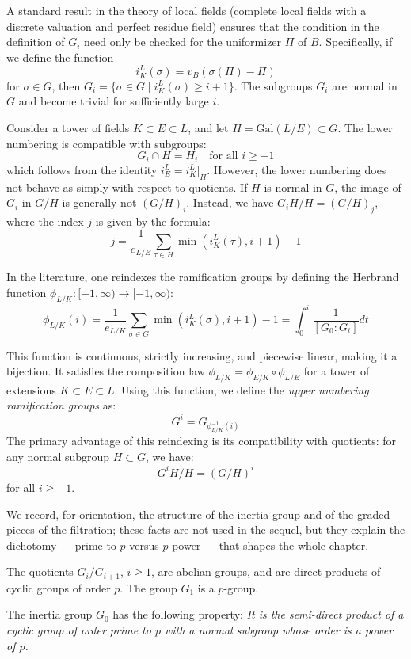 A standard result in the theory of local fields (complete local fields with a discrete valuation and perfect residue field)
ensures that the condition in the definition of $G_i$ need only be checked for the uniformizer $\Pi$ of $B$.
Specifically, if we define the function
\[
i^L_K(\sigma) = v_B(\sigma(\Pi) - \Pi)
\]
for $\sigma \in G$, then $G_i = \{ \sigma \in G \mid i^L_K(\sigma) \geq i + 1 \}$.
The subgroups $G_i$ are normal in $G$ and become trivial for sufficiently large $i$.

Consider a tower of fields $K \subset E \subset L$, and let $H = \text{Gal}(L/E) \subset G$. The lower numbering is compatible with subgroups:
\[
G_i \cap H = H_i \quad \text{for all } i \geq -1
\]
which follows from the identity $i^L_E = i^L_K|_{H}$.
However, the lower numbering does not behave as simply with respect to quotients. If $H$ is normal in $G$, the image of $G_i$ in $G/H$ is generally not $(G/H)_i$.
Instead, we have $G_i H / H = (G/H)_j$, where the index $j$ is given by the formula:
\[
j = \frac{1}{e_{L/E}} \sum_{\tau \in H} \min(i^L_K(\tau), i+1) - 1
\]


In the literature, one reindexes the ramification groups by defining the Herbrand function $\phi_{L/K} : [-1, \infty ) \to [-1, \infty )$:
\[ \phi_{L/K}(i) = \frac{1}{e_{L/K}}\sum_{\sigma \in G} \min(i^L_K(\sigma), i+1)-1 = \int _0^i \frac{1}{[G_0 : G_t]} dt \]

This function is continuous, strictly increasing, and piecewise linear, making it a bijection.
It satisfies the composition law $\phi_{L/K} = \phi_{E/K} \circ \phi_{L/E}$ for a tower of extensions $K \subset E \subset L$.
Using this function, we define the \textit{upper numbering ramification groups} as:
\[
G^i = G_{\phi_{L/K}^{-1}(i)}
\]
The primary advantage of this reindexing is its compatibility with quotients: for any normal subgroup $H \subset G$, we have:
\[
G^i H / H = (G/H)^i
\]
for all $i \geq -1$.

We record, for orientation, the structure of the inertia group and of the
graded pieces of the filtration; these facts are not used in the sequel, but
they explain the dichotomy --- prime-to-$p$ versus $p$-power --- that shapes
the whole chapter.

\begin{prop}
    The quotients $G_i/G_{i+1}$, $i \geq 1$, are abelian groups, and are direct products of cyclic groups of order $p$.
    The group $G_1$ is a $p$-group.
\end{prop}

\begin{prop}
    The inertia group $G_0$ has the following property:
    \textit{It is the semi-direct product of a cyclic group of order prime to $p$ with a normal subgroup whose order is a power of $p$.}
\end{prop}
